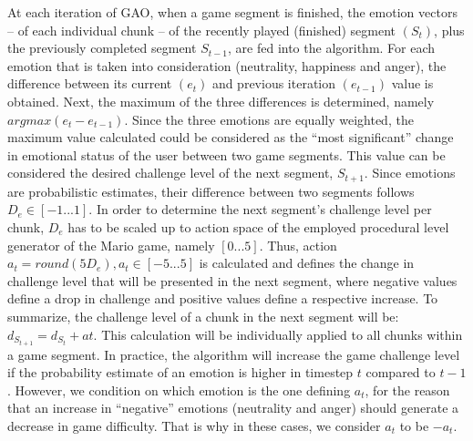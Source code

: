 \documentclass[letterpaper]{article}
\begin{document}
At each iteration of GAO, when a game segment is finished, the emotion vectors -- of each individual chunk -- of the recently played (finished) segment $(S_t)$, plus the previously completed segment $S_{t-1}$, are fed into the algorithm. For each emotion that is taken into consideration (neutrality, happiness and anger), the difference between its current $(e_t)$ and previous iteration $(e_{t-1})$ value is obtained. Next, the maximum of the three differences is determined, namely $argmax(e_t-e_{t-1})$. Since the three emotions are equally weighted, the maximum value calculated could be considered as the ``most significant'' change in emotional status of the user between two game segments. This value can be considered the desired challenge level of the next segment, $S_{t+1}$. Since emotions are probabilistic estimates, their difference between two segments follows $D_{e}\in[-1...1]$. In order to determine the next segment's challenge level per chunk, $D_{e}$ has to be scaled up to action space of the employed procedural level generator of the Mario game, namely $[0...5]$. Thus, action $a_{t} = round(5D_{e}), a_{t}\in[-5...5]$ is calculated and defines the change in challenge level that will be presented in the next segment, where negative values define a drop in challenge and positive values define a respective increase. To summarize, the challenge level of a chunk in the next segment will be: $d_{S_{t+1}} = d_{S_{t}}+a{t}$. This calculation will be individually applied to all chunks within a game segment. In practice, the algorithm will increase the game challenge level if the probability estimate of an emotion is higher in timestep $t$ compared to $t-1$. However, we condition on which emotion is the one defining $a_t$, for the reason that an increase in ``negative'' emotions (neutrality and anger) should generate a decrease in game difficulty. That is why in these cases, we consider $a_t$ to be $-a_t$.
\end{document}
